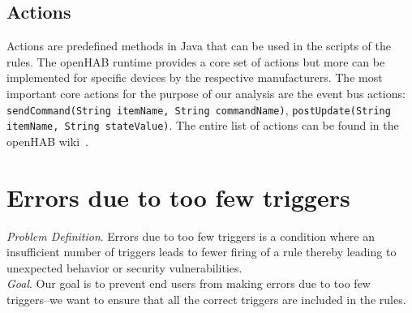 \documentclass{sig-alternate-05-2015}
\begin{document}
\subsection{Actions}
\label{subsec:actions}
Actions are predefined methods in Java that can be used in the scripts of the rules. The openHAB runtime provides a core set of actions but more can be implemented for specific devices by the respective manufacturers. The most important core actions for the purpose of our analysis are the event bus actions: \texttt{sendCommand(String itemName, String commandName)}, \texttt{postUpdate(String itemName, String stateValue)}. The entire list of actions can be found in the openHAB wiki~\cite{openhabwiki}.

\section{Errors due to too few triggers}
\emph{Problem Definition}. Errors due to too few triggers is a condition where an insufficient number of triggers leads to fewer firing of a rule thereby leading to unexpected behavior or security vulnerabilities. \\

\emph{Goal}. Our goal is to prevent end users from making errors due to too few triggers--we want to ensure that all the correct triggers are included in the rules. \\
\end{document}
